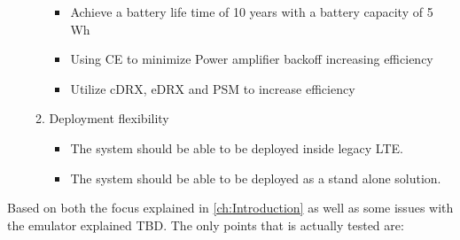 \begin{itemize}
\begin{enumerate}[resume]
		\begin{itemize}
		\item  Achieve a battery life time of 10 years with a battery capacity of 5 Wh
		\item Using \gls{CE} to minimize Power amplifier backoff increasing efficiency
		\item Utilize \gls{cDRX}, \gls{eDRX} and \gls{PSM} to increase efficiency
	\end{itemize}
	\item Deployment flexibility
		\begin{itemize}
		\item The system should be able to be deployed inside legacy \gls{LTE}.
		\item The system should be able to be deployed as a stand alone solution.
		\end{itemize}
	\end{enumerate}
\end{itemize}


Based on both the focus explained in \autoref{ch:Introduction} as well as some issues with the emulator explained TBD. The only points that is actually tested are:

